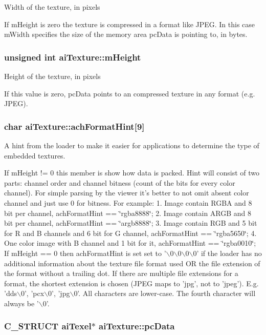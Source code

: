 Width of the texture, in pixels

If mHeight is zero the texture is compressed in a format like JPEG. In this case mWidth specifies the size of the memory area pcData is pointing to, in bytes. \hypertarget{structai_texture_c1e2fa6f1f646e9c55e3985d4418a752}{
\subsubsection[mHeight]{\setlength{\rightskip}{0pt plus 5cm}unsigned int {\bf aiTexture::mHeight}}}
\label{structai_texture_c1e2fa6f1f646e9c55e3985d4418a752}


Height of the texture, in pixels

If this value is zero, pcData points to an compressed texture in any format (e.g. JPEG). \hypertarget{structai_texture_8e281d19486df620af1b2869464fa5c0}{
\subsubsection[achFormatHint]{\setlength{\rightskip}{0pt plus 5cm}char {\bf aiTexture::achFormatHint}\mbox{[}9\mbox{]}}}
\label{structai_texture_8e281d19486df620af1b2869464fa5c0}


A hint from the loader to make it easier for applications to determine the type of embedded textures.

If mHeight != 0 this member is show how data is packed. Hint will consist of two parts: channel order and channel bitness (count of the bits for every color channel). For simple parsing by the viewer it's better to not omit absent color channel and just use 0 for bitness. For example: 1. Image contain RGBA and 8 bit per channel, achFormatHint == \char`\"{}rgba8888\char`\"{}; 2. Image contain ARGB and 8 bit per channel, achFormatHint == \char`\"{}argb8888\char`\"{}; 3. Image contain RGB and 5 bit for R and B channels and 6 bit for G channel, achFormatHint == \char`\"{}rgba5650\char`\"{}; 4. One color image with B channel and 1 bit for it, achFormatHint == \char`\"{}rgba0010\char`\"{}; If mHeight == 0 then achFormatHint is set set to '$\backslash$0$\backslash$0$\backslash$0$\backslash$0' if the loader has no additional information about the texture file format used OR the file extension of the format without a trailing dot. If there are multiple file extensions for a format, the shortest extension is chosen (JPEG maps to 'jpg', not to 'jpeg'). E.g. 'dds$\backslash$0', 'pcx$\backslash$0', 'jpg$\backslash$0'. All characters are lower-case. The fourth character will always be '$\backslash$0'. \hypertarget{structai_texture_eb07528748b6e49d2d81c60006024f9a}{
\subsubsection[pcData]{\setlength{\rightskip}{0pt plus 5cm}C\_\-STRUCT {\bf aiTexel}$\ast$ {\bf aiTexture::pcData}}}
\label{structai_texture_eb07528748b6e49d2d81c60006024f9a}


